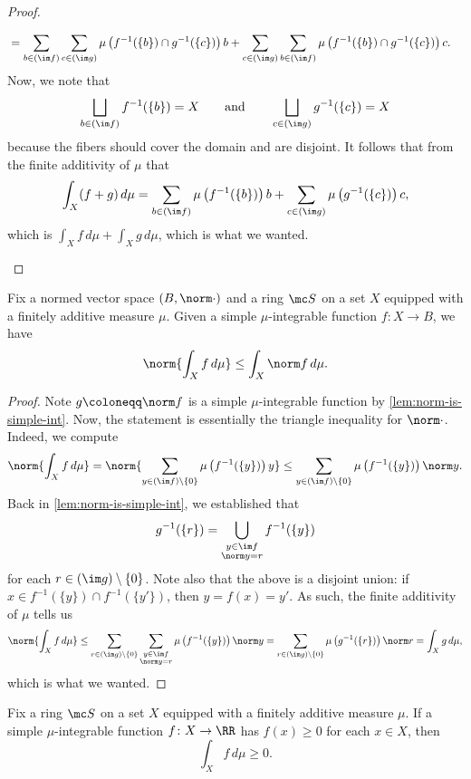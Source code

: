 \documentclass[../notes.tex]{subfiles}
\begin{document}
\begin{proof}
\begin{itemize}
\begin{align*}
			&= \sum_{b\in(\im f)}\sum_{c\in(\im g)}\mu\left(f^{-1}(\{b\})\cap g^{-1}(\{c\})\right)b+\sum_{c\in(\im g)}\sum_{b\in(\im f)}\mu\left(f^{-1}(\{b\})\cap g^{-1}(\{c\})\right)c.
		\end{align*}
		Now, we note that
		\[\bigsqcup_{b\in(\im f)}f^{-1}(\{b\})=X\qquad\text{and}\qquad\bigsqcup_{c\in(\im g)}g^{-1}(\{c\})=X\]
		because the fibers should cover the domain and are disjoint. It follows that from the finite additivity of $\mu$ that
		\[\int_X(f+g)\,d\mu = \sum_{b\in(\im f)}\mu\left(f^{-1}(\{b\})\right)b+\sum_{c\in(\im g)}\mu\left(g^{-1}(\{c\})\right)c,\]
		which is $\int_Xf\,d\mu+\int_Xg\,d\mu$, which is what we wanted.
		\qedhere
	\end{itemize}
\end{proof}
\begin{lemma} \label{lem:simple-bound-norm-int}
	Fix a normed vector space $(B,\norm\cdot)$ and a ring $\mc S$ on a set $X$ equipped with a finitely additive measure $\mu$. Given a simple $\mu$-integrable function $f\colon X\to B$, we have
	\[\norm{\int_Xf\,d\mu}\le\int_X\norm f\,d\mu.\]
\end{lemma}
\begin{proof}
	Note $g\coloneqq\norm f$ is a simple $\mu$-integrable function by \autoref{lem:norm-is-simple-int}. Now, the statement is essentially the triangle inequality for $\norm\cdot$. Indeed, we compute
	\[\norm{\int_Xf\,d\mu}=\norm{\sum_{y\in(\im f)\setminus\{0\}}\mu\left(f^{-1}(\{y\})\right)y}\le\sum_{y\in(\im f)\setminus\{0\}}\mu\left(f^{-1}(\{y\})\right)\norm y.\]
	Back in \autoref{lem:norm-is-simple-int}, we established that
	\[g^{-1}(\{r\})=\bigcup_{\substack{y\in\im f\\\norm y=r}}f^{-1}(\{y\})\]
	for each $r\in(\im g)\setminus\{0\}$. Note also that the above is a disjoint union: if $x\in f^{-1}(\{y\})\cap f^{-1}(\{y'\})$, then $y=f(x)=y'$. As such, the finite additivity of $\mu$ tells us
	\[\norm{\int_Xf\,d\mu}\le\sum_{r\in(\im g)\setminus\{0\}}\sum_{\substack{y\in\im f\\\norm y=r}}\mu\left(f^{-1}(\{y\})\right)\norm y=\sum_{r\in(\im g)\setminus\{0\}}\mu\left(g^{-1}(\{r\})\right)\norm r=\int_Xg\,d\mu,\]
	which is what we wanted.
\end{proof}
\begin{lemma} \label{lem:simple-int-positivity}
	Fix a ring $\mc S$ on a set $X$ equipped with a finitely additive measure $\mu$. If a simple $\mu$-integrable function $f\colon X\to\RR$ has $f(x)\ge0$ for each $x\in X$, then
	\[\int_Xf\,d\mu\ge0.\]
\end{lemma}
\end{document}
